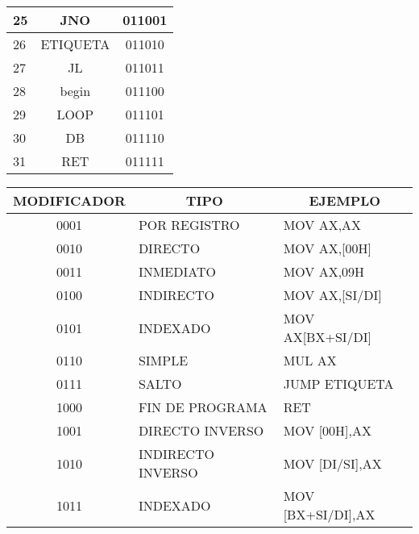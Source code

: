 \documentclass[conference]{IEEEtran}
\begin{document}
\begin{table}[h]
\begin{tabular}{|l|c|c|}
    25                                          & JNO                               & 011001                                 \\ \hline
    26                                          & ETIQUETA                          & 011010                                 \\ \hline
    27                                          & JL                                & 011011                                 \\ \hline
    28                                          & begin                             & 011100                                 \\ \hline
    29                                          & LOOP                              & 011101                                 \\ \hline
    30                                          & DB                                & 011110                                 \\ \hline
    31                                          & RET                               & 011111                                 \\ \hline                                                                                 
    \end{tabular}%
    \end{table}

    \begin{table}[h]
        \begin{tabular}{|c|l|l|}
        \hline
        MODIFICADOR & \multicolumn{1}{c|}{TIPO} & \multicolumn{1}{c|}{EJEMPLO} \\ \hline
        0001        & POR REGISTRO              & MOV AX,AX                    \\ \hline
        0010        & DIRECTO                   & MOV AX,[00H]                 \\ \hline
        0011        & INMEDIATO                 & MOV AX,09H                   \\ \hline
        0100        & INDIRECTO                 & MOV AX,[SI/DI]               \\ \hline
        0101        & INDEXADO                  & MOV AX[BX+SI/DI]             \\ \hline
        0110        & SIMPLE                    & MUL AX                       \\ \hline
        0111        & SALTO                     & JUMP ETIQUETA                \\ \hline
        1000        & FIN DE PROGRAMA           & RET                          \\ \hline
        1001        & DIRECTO  INVERSO          & MOV [00H],AX                 \\ \hline
        1010        & INDIRECTO INVERSO         & MOV [DI/SI],AX               \\ \hline
        1011        & INDEXADO                  & MOV [BX+SI/DI],AX            \\ \hline
        \end{tabular}
        \end{table}  
\end{document}

